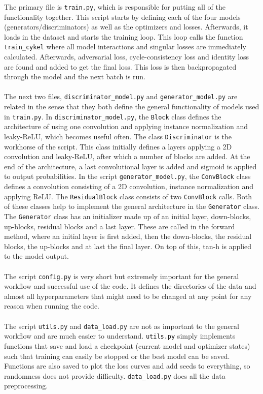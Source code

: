 \documentclass[12pt, fleqn, titlepage]{article}
\newcommand{\1}[1]{\mathds{1}\left[#1\right]}
\begin{document}
\noindent
The primary file is \texttt{train.py}, which is responsible for putting all of the functionality together. This script starts by defining each of the four models (generators/discriminators) as well as the optimizers and losses. Afterwards, it loads in the dataset and starts the training loop. This loop calls the function \texttt{train\_cykel} where all model interactions and singular losses are immediately calculated. Afterwards, adversarial loss, cycle-consistency loss and identity loss are found and added to get the final loss. This loss is then backpropagated through the model and the next batch is run.
\\\\
The next two files, \texttt{discriminator\_model.py} and \texttt{generator\_model.py} are related in the sense that they both define the general functionality of models used in \texttt{train.py}. In \texttt{discriminator\_model.py}, the \texttt{Block} class defines the architecture of using one convolution and applying instance normalization and leaky-ReLU, which becomes useful often. The class \texttt{Discriminator} is the workhorse of the script. This class initially defines a layers applying a 2D convolution and leaky-ReLU, after which a number of blocks are added. At the end of the architecture, a last convolutional layer is added and sigmoid is applied to output probabilities. In the script \texttt{generator\_model.py}, the \texttt{ConvBlock} class defines a convolution consisting of a 2D convolution, instance normalization and applying ReLU. The \texttt{ResidualBlock} class consists of two \texttt{ConvBlock} calls. Both of these classes help to implement the general architecture in the \texttt{Generator} class. The \texttt{Generator} class has an initializer made up of an initial layer, down-blocks, up-blocks, residual blocks and a last layer. These are called in the forward method, where an initial layer is first added, then the down-blocks, the residual blocks, the up-blocks and at last the final layer. On top of this, tan-h is applied to the model output.
\\\\
The script \texttt{config.py} is very short but extremely important for the general workflow and successful use of the code. It defines the directories of the data and almost all hyperparameters that might need to be changed at any point for any reason when running the code.
\\\\
The script \texttt{utils.py} and \texttt{data\_load.py} are not as important to the general workflow and are much easier to understand. \texttt{utils.py} simply implements functions that save and load a checkpoint (current model and optimizer states) such that training can easily be stopped or the best model can be saved. Functions are also saved to plot the loss curves and add seeds to everything, so randomness does not provide difficulty. \texttt{data\_load.py} does all the data preprocessing.
\end{document}
